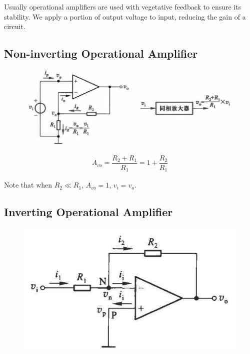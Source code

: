 Usually operational amplifiers are used with vegetative feedback to ensure its stability. We apply a portion of output voltage to input, reducing the gain of a circuit.

\subsection{Non-inverting Operational Amplifier}

\begin{figure}[H]
  \centering
  \includegraphics[width=\linewidth]{figures/non-inverting-amplifier}
\end{figure}

\begin{equation*}
  \begin{aligned}
    A_{vo} = \dfrac{R_2 + R_1}{R_1} = 1 + \dfrac{R_2}{R_1} 
  \end{aligned}
\end{equation*}

Note that when $R_2\ll R_1$, $A_{vo} = 1$, $v_i = v_o$.

\subsection{Inverting Operational Amplifier}

\begin{figure}[H]
  \centering
  \includegraphics[width=0.7\linewidth]{figures/inverting-amplifier}
\end{figure}

